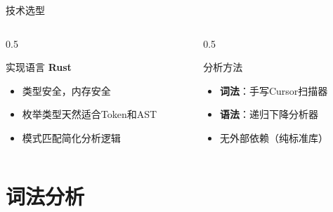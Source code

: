 \documentclass[aspectratio=169]{ctexbeamer}
\begin{document}
\begin{frame}{技术选型}
    \begin{columns}[T]
        \begin{column}{0.5\textwidth}
            \begin{block}{实现语言}
                \textbf{Rust}
                \begin{itemize}
                    \item 类型安全，内存安全
                    \item 枚举类型天然适合Token和AST
                    \item 模式匹配简化分析逻辑
                \end{itemize}
            \end{block}
        \end{column}
        \begin{column}{0.5\textwidth}
            \begin{block}{分析方法}
                \begin{itemize}
                    \item \textbf{词法}：手写Cursor扫描器
                    \item \textbf{语法}：递归下降分析器
                    \item 无外部依赖（纯标准库）
                \end{itemize}
            \end{block}
        \end{column}
    \end{columns}
\end{frame}

\section{词法分析}
\end{document}
